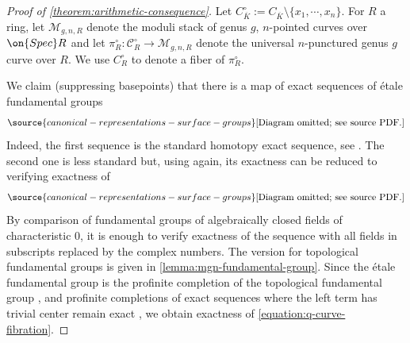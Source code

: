 \begin{proof}[Proof of \autoref{theorem:arithmetic-consequence}]
	Let $C^\circ_{\overline K} :=
	C_{\overline{K}}\setminus\{x_1, \cdots, x_n\}$. For $R$ a ring, let $\mathscr
	M_{g,n,R}$ denote the moduli stack of genus $g$, $n$-pointed curves over
	$\on{Spec} R$
	and let $\pi^\circ_R: \mathscr C_R^\circ \to \mathscr M_{g,n,R}$ denote the universal $n$-punctured genus
	$g$ curve over $R$.
	We use $C^\circ_R$ to denote a fiber of $\pi^\circ_R$.

	We claim (suppressing basepoints) that there is a map of exact sequences of \'etale fundamental groups
	\begin{equation}
	\label{equation:map-of-birman-exact-sequences}
\source{canonical-representations-surface-groups}
	\text{[Diagram omitted; see source PDF.]}\end{equation}
	Indeed, the first sequence is the standard homotopy exact sequence, see
	\cite[\href{https://stacks.math.columbia.edu/tag/0BTX}{Tag
	0BTX}]{stacks-project}.
	The second one is less standard but, using
	\cite[\href{https://stacks.math.columbia.edu/tag/0BTX}{Tag
	0BTX}]{stacks-project} again, its exactness
	can be reduced to verifying exactness of
	\begin{equation}
	\label{equation:q-curve-fibration}
\source{canonical-representations-surface-groups}
	\text{[Diagram omitted; see source PDF.]}\end{equation}
	By comparison of fundamental groups of algebraically closed fields of
	characteristic $0$, it is enough to verify exactness of the sequence
	with all fields in subscripts replaced by the complex numbers.
	The version for topological fundamental groups is given in
	\autoref{lemma:mgn-fundamental-group}. Since the \'etale fundamental
	group is the profinite completion of the topological fundamental group
	\cite[Expos\'e XII, Corollaire 5.2]{sga1},
	and profinite completions of exact sequences where the left term has
	trivial center remain exact \cite[Proposition
	3]{anderson:exactness-properties}, we obtain exactness of
	\eqref{equation:q-curve-fibration}.


\end{proof}
